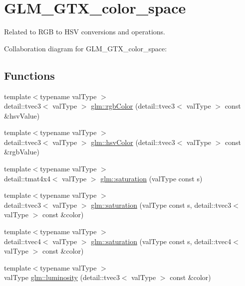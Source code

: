 \hypertarget{group__gtx__color__space}{}\section{G\+L\+M\+\_\+\+G\+T\+X\+\_\+color\+\_\+space}
\label{group__gtx__color__space}


Related to R\+G\+B to H\+S\+V conversions and operations.  


Collaboration diagram for G\+L\+M\+\_\+\+G\+T\+X\+\_\+color\+\_\+space\+:
\subsection*{Functions}
\begin{DoxyCompactItemize}
\item 
{\footnotesize template$<$typename val\+Type $>$ }\\detail\+::tvec3$<$ val\+Type $>$ \hyperlink{group__gtx__color__space_ga0106a26e8ceac4e83b428979eb70c6e5}{glm\+::rgb\+Color} (detail\+::tvec3$<$ val\+Type $>$ const \&hsv\+Value)
\item 
{\footnotesize template$<$typename val\+Type $>$ }\\detail\+::tvec3$<$ val\+Type $>$ \hyperlink{group__gtx__color__space_ga434478ff2e692c2bc9fbe4d3a05570ea}{glm\+::hsv\+Color} (detail\+::tvec3$<$ val\+Type $>$ const \&rgb\+Value)
\item 
{\footnotesize template$<$typename val\+Type $>$ }\\detail\+::tmat4x4$<$ val\+Type $>$ \hyperlink{group__gtx__color__space_ga81289d2f4a42f70d5cf66dbb6e75dc97}{glm\+::saturation} (val\+Type const s)
\item 
{\footnotesize template$<$typename val\+Type $>$ }\\detail\+::tvec3$<$ val\+Type $>$ \hyperlink{group__gtx__color__space_ga54a479f39450ab45417f5d48abee5fb2}{glm\+::saturation} (val\+Type const s, detail\+::tvec3$<$ val\+Type $>$ const \&color)
\item 
{\footnotesize template$<$typename val\+Type $>$ }\\detail\+::tvec4$<$ val\+Type $>$ \hyperlink{group__gtx__color__space_ga2bdc5f77884c822b0dbc92d74a649d87}{glm\+::saturation} (val\+Type const s, detail\+::tvec4$<$ val\+Type $>$ const \&color)
\item 
{\footnotesize template$<$typename val\+Type $>$ }\\val\+Type \hyperlink{group__gtx__color__space_gaf9db3b89515c57d9d955b70a97c10f91}{glm\+::luminosity} (detail\+::tvec3$<$ val\+Type $>$ const \&color)
\end{DoxyCompactItemize}


